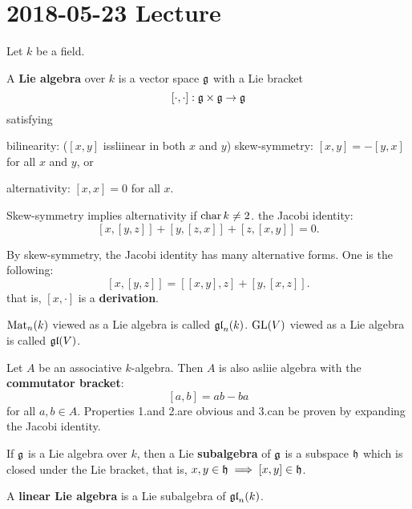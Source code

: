 \section{2018-05-23 Lecture}

Let $k$ be a field.

\begin{defn}
  A \textbf{Lie algebra} over $k$ is a vector space $\mathfrak{g}$ with a Lie bracket
  \[ [\cdot,\cdot]: \mathfrak{g} \times \mathfrak{g} \to \mathfrak{g} \]
  satisfying
  \begin{enum}
    \io bilinearity: ($[x,y]$ issliinear in both $x$ and $y$)
    \io skew-symmetry: $[x,y]=-[y,x]$ for all $x$ and $y$, or
    \begin{enum}
      \io alternativity: $[x,x]=0$ for all $x$.
    \end{enum}
    Skew-symmetry implies alternativity if $\operatorname{char} k \neq 2$.
    \io the Jacobi identity:
    \[ [x,[y,z]] + [y,[z,x]] + [z,[x,y]]=0. \]
  \end{enum}
\end{defn}

\begin{rmk}
  By skew-symmetry, the Jacobi identity has many alternative forms.
  One is the following:
  \[ [x,[y,z]] = [[x,y],z] + [y,[x,z]]. \]
  that is, $[x,\cdot]$ is a \textbf{derivation}.
\end{rmk}

\begin{rmk}
  $\operatorname{Mat}_n(k)$ viewed as a Lie algebra is called $\operatorname{\mathfrak{gl}}_n(k)$.
  $\operatorname{GL}(V)$ viewed as a Lie algebra is called $\operatorname{\mathfrak{gl}}(V)$.
\end{rmk}

\begin{exam}
  Let $A$ be an associative $k$-algebra.
  Then $A$ is also asliie algebra with the \textbf{commutator bracket}:
  \[ [a,b]=ab-ba \]
  for all $a,b \in A$.
  Properties 1.\@ and 2.\@ are obvious and 3.\@ can be proven by expanding the Jacobi identity.
\end{exam}

\begin{defn}
  If $\mathfrak{g}$ is a Lie algebra over $k$, then a Lie \textbf{subalgebra} of $\mathfrak{g}$ is a subspace $\mathfrak{h}$ which is closed under the Lie bracket, that is, $x,y \in \mathfrak{h} \implies [x,y] \in \mathfrak{h}$.
\end{defn}

\begin{defn}
  A \textbf{linear Lie algebra} is a Lie subalgebra of $\operatorname{\mathfrak{gl}}_n(k)$.
\end{defn}

